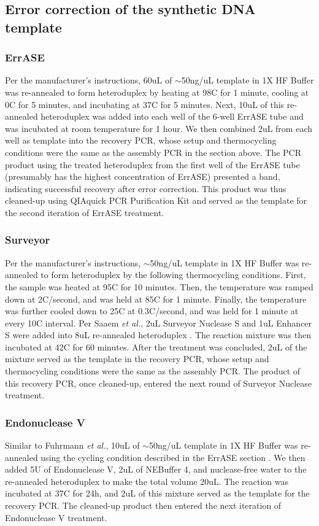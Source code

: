 \documentclass[twocolumn]{article}
\begin{document}
\subsection*{Error correction of the synthetic DNA template}
\subsubsection*{ErrASE}
Per the manufacturer’s instructions, 60uL of $\sim$50ng/uL template in 1X HF Buffer was re-annealed to form heteroduplex by heating at 98C for 1 minute, cooling at 0C for 5 minutes, and incubating at 37C for 5 minutes. Next, 10uL of this re-annealed heteroduplex was added into each well of the 6-well ErrASE tube and was incubated at room temperature for 1 hour. We then combined 2uL from each well as template into the recovery PCR, whose setup and thermocycling conditions were the same as the assembly PCR in the section above. The PCR product using the treated heteroduplex from the first well of the ErrASE tube (presumably has the highest concentration of ErrASE) presented a band, indicating successful recovery after error correction. This product was thus cleaned-up using QIAquick PCR Purification Kit and served as the template for the second iteration of ErrASE treatment.

\subsubsection*{Surveyor}
Per the manufacturer’s instructions, $\sim$50ng/uL template in 1X HF Buffer was re-annealed to form heteroduplex by the following thermocycling conditions. First, the sample was heated at 95C for 10 minutes. Then, the temperature was ramped down at 2C/second, and was held at 85C for 1 minute. Finally, the temperature was further cooled down to 25C at 0.3C/second, and was held for 1 minute at every 10C interval. Per Saaem \textit{et al.}, 2uL Surveyor Nuclease S and 1uL Enhancer S were added into 8uL re-annealed heteroduplex \cite{saaem2012}. The reaction mixture was then incubated at 42C for 60 minutes. After the treatment was concluded, 2uL of the mixture served as the template in the recovery PCR, whose setup and thermocycling conditions were the same as the assembly PCR. The product of this recovery PCR, once cleaned-up, entered the next round of Surveyor Nuclease treatment.

\subsubsection*{Endonuclease V}
Similar to Fuhrmann \textit{et al.}, 10uL of $\sim$50ng/uL template in 1X HF Buffer was re-annealed using the cycling condition described in the ErrASE section \cite{fuhrmann2005}. We then added 5U of Endonuclease V, 2uL of NEBuffer 4, and nuclease-free water to the re-annealed heteroduplex to make the total volume 20uL. The reaction was incubated at 37C for 24h, and 2uL of this mixture served as the template for the recovery PCR. The cleaned-up product then entered the next iteration of Endonuclease V treatment.
\end{document}
